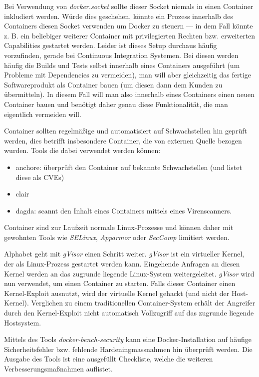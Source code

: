Bei Verwendung von \textit{docker.socket} sollte dieser Socket niemals in einen Container inkludiert werden. Würde dies geschehen, könnte ein Prozess innerhalb des Containers diesen Socket verwenden um Docker zu steuern --- in dem Fall könnte z. B. ein beliebiger weiterer Container mit privilegierten Rechten bzw. erweiterten Capabilities gestartet werden. Leider ist dieses Setup durchaus häufig vorzufinden, gerade bei Continuous Integration Systemen. Bei diesen werden häufig die Builds und Tests selbst innerhalb eines Containers ausgeführt (um Probleme mit Dependencies zu vermeiden), man will aber gleichzeitig das fertige Softwareprodukt als Container bauen (um diesen dann dem Kunden zu übermitteln). In diesem Fall will man also innerhalb eines Containers einen neuen Container bauen und benötigt daher genau diese Funktionalität, die man eigentlich vermeiden will.

Container sollten regelmäßige und automatisiert auf Schwachstellen hin geprüft werden, dies betrifft insbesondere Container, die von externen Quelle bezogen wurden. Tools die dabei verwendet werden können:

\begin{itemize}
	\item anchore: überprüft den Container auf bekannte Schwachstellen (und listet diese als CVEs)
	\item clair
	\item dagda: scannt den Inhalt eines Containers mittels eines Virenscanners.
\end{itemize}

Container sind zur Laufzeit normale Linux-Prozesse und können daher mit gewohnten Tools wie \textit{SELinux}, \textit{Apparmor} oder \textit{SecComp} limitiert werden.

Alphabet geht mit \textit{gVisor} einen Schritt weiter. \textit{gVisor} ist ein virtueller Kernel, der als Linux-Prozess gestartet werden kann. Eingehende Anfragen an diesen Kernel werden an das zugrunde liegende Linux-System weitergeleitet. \textit{gVisor} wird nun verwendet, um einen Container zu starten. Falls dieser Container einen Kernel-Exploit ausnutzt, wird der virtuelle Kernel gehackt (und nicht der Host-Kernel). Verglichen zu einem traditionellen Container-System erhält der Angreifer durch den Kernel-Exploit nicht automatisch Vollzugriff auf das zugrunde liegende Hostsystem.

Mittels des Tools \textit{docker-bench-security} kann eine Docker-Installation auf häufige Sicherheitsfehler bzw. fehlende Hardeningmassnahmen hin überprüft werden. Die Ausgabe des Tools ist eine ausgefüllt Checkliste, welche die weiteren Verbesserungsmaßnahmen auflistet.


